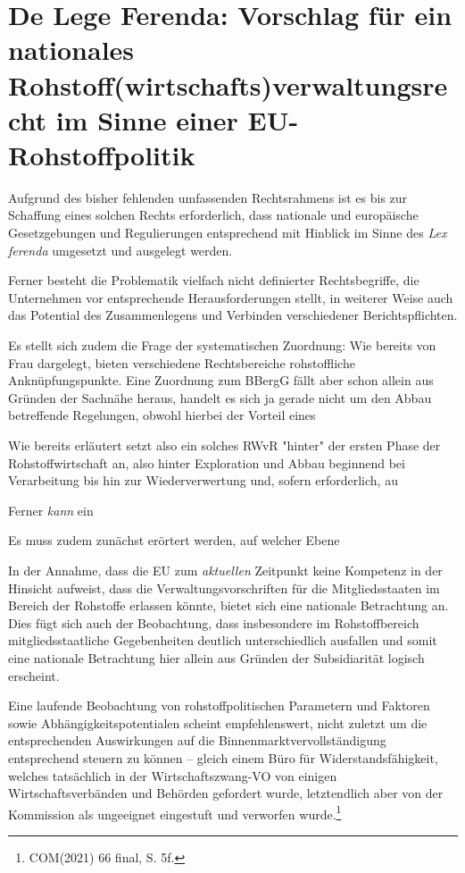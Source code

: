 \documentclass[12pt,a4paper,oneside]{book} %
\begin{document}
\section{De Lege Ferenda: Vorschlag für ein nationales Rohstoff(wirtschafts)verwaltungsrecht im Sinne einer EU-Rohstoffpolitik}

Aufgrund des bisher fehlenden umfassenden Rechtsrahmens ist es bis zur Schaffung eines solchen Rechts erforderlich, dass nationale und europäische Gesetzgebungen und Regulierungen entsprechend mit Hinblick im Sinne des \textit{Lex ferenda} umgesetzt und ausgelegt werden. 

Ferner besteht die Problematik vielfach nicht definierter Rechtsbegriffe, die Unternehmen vor entsprechende Herausforderungen stellt, in weiterer Weise auch das Potential des Zusammenlegens und Verbinden verschiedener Berichtspflichten.\autocite{Schäffer, EuZW 2023, 695, 700}

Es stellt sich zudem die Frage der systematischen Zuordnung: Wie bereits von Frau \autocite{frau2023} dargelegt, bieten verschiedene Rechtsbereiche rohstoffliche Anknüpfungspunkte. Eine Zuordnung zum BBergG fällt aber schon allein aus Gründen der Sachnähe heraus, handelt es sich ja gerade nicht um den Abbau betreffende Regelungen, obwohl hierbei der Vorteil eines

Wie bereits erläutert setzt also ein solches RWvR "hinter" der ersten Phase der Rohstoffwirtschaft an, also hinter Exploration und Abbau beginnend bei Verarbeitung bis hin zur Wiederverwertung und, sofern erforderlich, au

Ferner \textit{kann} ein 

Es muss zudem zunächst erörtert werden, auf welcher Ebene

In der Annahme, dass die EU zum \textit{aktuellen} Zeitpunkt keine Kompetenz in der Hinsicht aufweist, dass die Verwaltungsvorschriften für die Mitgliedsstaaten im Bereich der Rohstoffe erlassen könnte, bietet sich eine nationale Betrachtung an. Dies fügt sich auch der Beobachtung, dass insbesondere im Rohstoffbereich mitgliedsstaatliche Gegebenheiten deutlich unterschiedlich ausfallen und somit eine nationale Betrachtung hier allein aus Gründen der Subsidiarität logisch erscheint.

Eine laufende Beobachtung von rohstoffpolitischen Parametern und Faktoren sowie Abhängigkeitspotentialen scheint empfehlenswert, nicht zuletzt um die entsprechenden Auswirkungen auf die Binnenmarktvervollständigung entsprechend steuern zu können -- gleich einem \glqq Büro für Widerstandsfähigkeit\grqq, welches tatsächlich in der Wirtschaftszwang-VO von einigen Wirtschaftsverbänden und Behörden gefordert wurde, letztendlich aber von der Kommission als ungeeignet eingestuft und verworfen wurde.\footnote{COM(2021) 66 final, S. 5f.}
\end{document}
